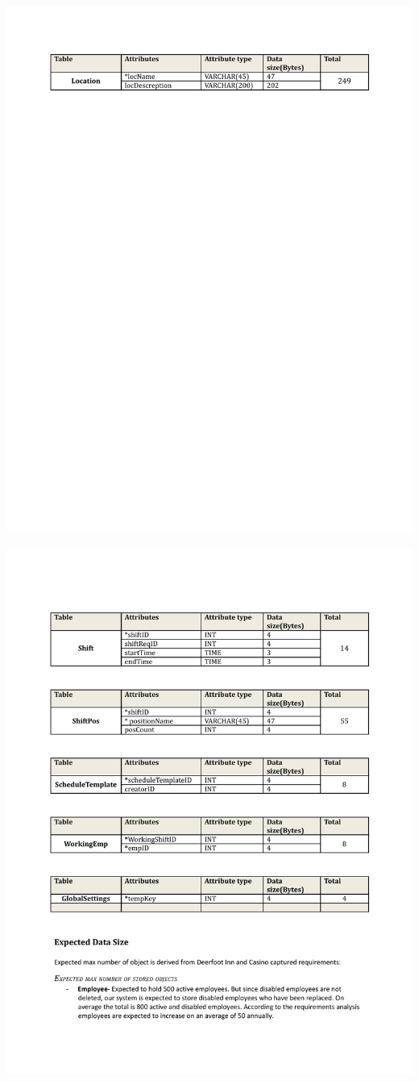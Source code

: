 \documentclass[letterpaper,12pt]{report}
\begin{document}
\newpage
\includegraphics[trim=30mm 10mm 25mm 30mm]{ExternalFiles/DocumentStuff/datasizes4.pdf}

\newpage
\includegraphics[trim=30mm 10mm 25mm 30mm]{ExternalFiles/DocumentStuff/datasizes5.pdf}
\end{document}
